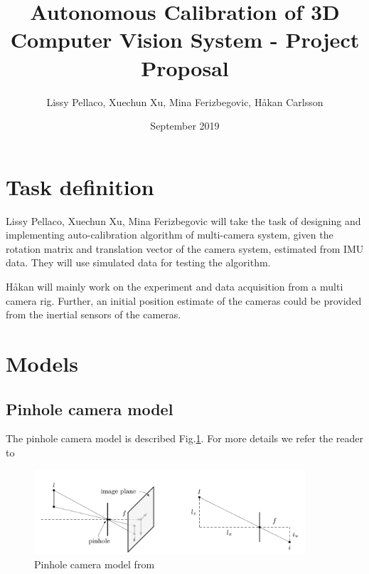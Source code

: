 \documentclass[12pt]{extarticle}
\title{Autonomous Calibration of 3D Computer Vision System - Project Proposal}
\author{Lissy Pellaco, Xuechun Xu, Mina Ferizbegovic, Håkan Carlsson}
\date{September 2019}
\begin{document}
\maketitle

\section{Task definition}
Lissy Pellaco, Xuechun Xu, Mina Ferizbegovic will take the task of
designing and implementing auto-calibration algorithm of multi-camera
system, given the rotation matrix and translation vector of the camera
system, estimated from IMU data. They will use simulated data for
testing the algorithm.

H\aa kan will mainly work on the experiment and data acquisition from
a multi camera rig. Further, an initial position estimate of the
cameras could be provided from the inertial sensors of the cameras.

\section{Models}

\subsection{Pinhole camera model}
\label{sec:pinhole}

The pinhole camera model is described Fig.\ref{fig:pinhole_camera}. For more details we refer the reader to ~\cite{pinholemodel}

\begin{figure}[t]
  \centering
  \includegraphics[width=0.9\textwidth]{figs/pinhole_camera.png}
  \caption{Pinhole camera model from \cite{Kok2017b}}
  \label{fig:pinhole_camera}
\end{figure}
\end{document}
